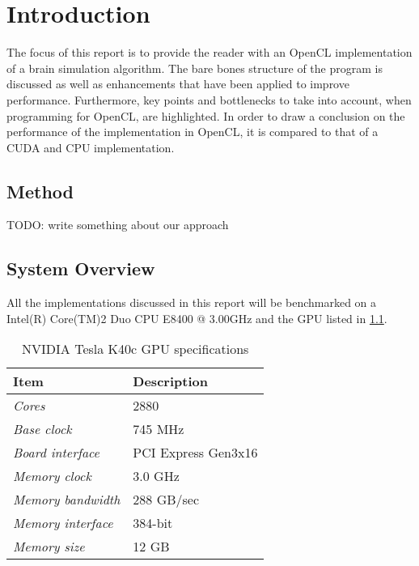 \documentclass[final]{report}
\begin{document}
\chapter{Introduction}

The focus of this report is to provide the reader with an OpenCL implementation of a brain simulation algorithm.
The bare bones structure of the program is discussed as well as enhancements that have been applied to improve performance.
Furthermore, key points and bottlenecks to take into account, when programming for OpenCL, are highlighted. 
In order to draw a conclusion on the performance of the implementation in OpenCL, it is compared to that of a CUDA and CPU implementation.

\section{Method}

TODO: write something about our approach




\section{System Overview}
All the implementations discussed in this report will be benchmarked on a Intel(R) Core(TM)2 Duo CPU E8400 @ 3.00GHz and the GPU listed in \cref{tab:gpu-specs}.




\begin{table}[H]
	\centering
	\caption{NVIDIA Tesla K40c GPU specifications}
	\label{tab:gpu-specs}
	\begin{tabular}{ll}
		\toprule
			\textbf{Item} &\textbf{Description}\\
		\midrule
			\textit{Cores} & 2880	\\
			\textit{Base clock} & 745 MHz \\
			\textit{Board interface} & PCI Express Gen3x16 \\
			\textit{Memory clock} & 3.0 GHz \\
			\textit{Memory bandwidth} & 288 GB/sec \\
			\textit{Memory interface} & 384-bit \\
			\textit{Memory size} & 12 GB \\
		\bottomrule
	\end{tabular}
\end{table}
\end{document}
